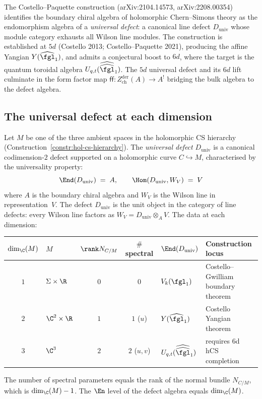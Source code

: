 The Costello--Paquette construction (arXiv:2104.14573, arXiv:2208.00354) identifies the boundary chiral algebra of holomorphic Chern--Simons theory as the endomorphism algebra of a \emph{universal defect}: a canonical line defect $D_{\mathrm{univ}}$ whose module category exhausts all Wilson line modules. The construction is established at $5d$ (Costello 2013; Costello--Paquette 2021), producing the affine Yangian $Y(\widehat{\fgl}_1)$, and admits a conjectural boost to $6d$, where the target is the quantum toroidal algebra $U_{q,t}(\widehat{\widehat{\fgl}}_1)$. The $5d$ universal defect and its $6d$ lift culminate in the form factor map $\mathsf{ff} \colon Z^{\mathrm{der}}_{\mathrm{ch}}(A) \to A^!$ bridging the bulk algebra to the defect algebra.

\subsection{The universal defect at each dimension}
\label{subsec:cp-universal-defect-dims}

\begin{construction}
\label{constr:cp-universal-defect}
Let $M$ be one of the three ambient spaces in the holomorphic CS hierarchy (Construction~\ref{constr:hol-cs-hierarchy}). The \emph{universal defect} $D_{\mathrm{univ}}$ is a canonical codimension-$2$ defect supported on a holomorphic curve $C \hookrightarrow M$, characterised by the universality property:
\[
 \End(D_{\mathrm{univ}}) \;=\; A, \qquad \Hom(D_{\mathrm{univ}}, W_V) \;=\; V
\]
where $A$ is the boundary chiral algebra and $W_V$ is the Wilson line in representation~$V$. The defect $D_{\mathrm{univ}}$ is the unit object in the category of line defects: every Wilson line factors as $W_V = D_{\mathrm{univ}} \otimes_A V$. The data at each dimension:
\begin{center}
\small
\renewcommand{\arraystretch}{1.2}
\begin{tabular}{clccll}
\toprule
$\dim_\C(M)$ & $M$ & $\rank N_{C/M}$ & $\#$ spectral & $\End(D_{\mathrm{univ}})$ & Construction locus \\
\midrule
$1$ & $\Sigma \times \R$ & $0$ & $0$ & $V_k(\fgl_1)$ & Costello--Gwilliam boundary theorem \\
$2$ & $\C^2 \times \R$ & $1$ & $1$ ($u$) & $Y(\widehat{\fgl}_1)$ & Costello Yangian theorem \\
$3$ & $\C^3$ & $2$ & $2$ ($u, v$) & $U_{q,t}(\widehat{\widehat{\fgl}}_1)$ & requires 6d hCS completion \\
\bottomrule
\end{tabular}
\end{center}
The number of spectral parameters equals the rank of the normal bundle $N_{C/M}$, which is $\dim_\C(M) - 1$. The $\En$ level of the defect algebra equals $\dim_\C(M)$.
\end{construction}

